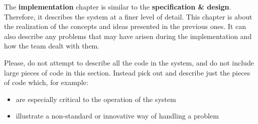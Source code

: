 
The \textbf{implementation} chapter is similar to the \textbf{specification \& design}. Therefore, it describes the system at a finer level of detail. This chapter is about the realization of the concepts and ideas presented in the previous ones. It can also describe any problems that may have arisen during the implementation and how the team dealt with them.

Please, do not attempt to describe all the code in the system, and do not include large pieces of code in this section. Instead pick out and describe just the pieces of code which, for example:

\begin{itemize}
	\item are especially critical to the operation of the system
	\item illustrate a non-standard or innovative way of handling a problem
\end{itemize}